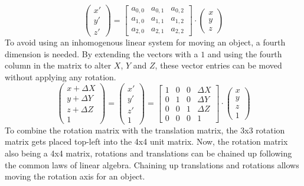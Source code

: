 \begin{equation*}
    \begin{pmatrix}
    x'  \\
    y'  \\
    z' 
    \end{pmatrix} 
    = 
    \begin{bmatrix}
a_{0,0} & a_{0,1} & a_{0,2}  \\
a_{1,0} & a_{1,1} & a_{1,2}  \\
a_{2,0} & a_{2,1} & a_{2,2} 
\end{bmatrix}
\cdot 
\begin{pmatrix}
    x  \\
    y  \\
    z 
    \end{pmatrix}
\end{equation*}
To avoid using an inhomogenous linear system for moving an object, a fourth dimension is needed. By extending the vectors with a $1$ and using the fourth column in the matrix to alter $X$, $Y$ and $Z$, these vector entries can be moved without applying any rotation. 
\begin{equation*}
    \begin{pmatrix}
        x+\Delta X  \\
        y+\Delta Y  \\
        z+\Delta Z  \\
        1
        \end{pmatrix} 
        = 
    \begin{pmatrix}
    x'  \\
    y'  \\
    z'  \\
    1
    \end{pmatrix} 
    = 
    \begin{bmatrix}
1 & 0 & 0 & \Delta X \\
0 & 1 & 0 & \Delta Y  \\
0 & 0 & 1 & \Delta Z  \\
0 & 0 & 0 & 1
\end{bmatrix}
\cdot 
\begin{pmatrix}
    x  \\
    y  \\
    z  \\
    1
    \end{pmatrix}
\end{equation*}
To combine the rotation matrix with the translation matrix, the 3x3 rotation matrix gets placed top-left into the 4x4 unit matrix. Now, the rotation matrix also being a 4x4 matrix, rotations and translations can be chained up following the common laws of linear algebra. Chaining up translations and rotations allows moving the rotation axis for an object.
